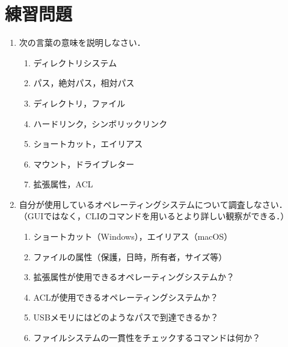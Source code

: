 \section*{練習問題}
\begin{enumerate}
\item 次の言葉の意味を説明しなさい．
  \begin{enumerate}
  \item ディレクトリシステム
  \item パス，絶対パス，相対パス
  \item ディレクトリ，ファイル
  \item ハードリンク，シンボリックリンク
  \item ショートカット，エイリアス
  \item マウント，ドライブレター
  \item 拡張属性，ACL
  \end{enumerate}

\item 自分が使用しているオペレーティングシステムについて調査しなさい．\\
  （GUIではなく，CLIのコマンドを用いるとより詳しい観察ができる．）
  \begin{enumerate}
  \item ショートカット（Windows），エイリアス（macOS）
  \item ファイルの属性（保護，日時，所有者，サイズ等）
  \item 拡張属性が使用できるオペレーティングシステムか？
  \item ACLが使用できるオペレーティングシステムか？
  \item USBメモリにはどのようなパスで到達できるか？
  \item ファイルシステムの一貫性をチェックするコマンドは何か？
  \end{enumerate}


\end{enumerate}
